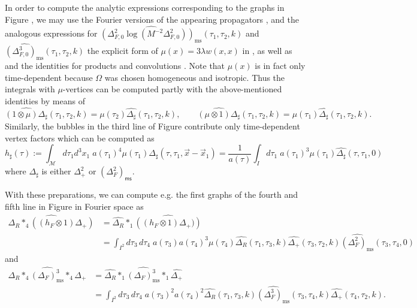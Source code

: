 \documentclass[10pt]{book}
\newcommand{\ms}{\mathsf{ms}}
\let\int\int
\newcommand{\Mcal}{\mathcal{M}}
\theoremstyle{break}
\begin{document}
In order to compute the analytic expressions corresponding to the graphs in Figure %
, we may use the Fourier versions of the appearing propagators %
, and the analogous expressions for $\widehat{\left(\Delta^2_{F,0}\log\left(M^{-2}\Delta^2_{F,0}\right) \right)_\text{ms}}(\tau_1,\tau_2,k)$ and 
$\widehat{\left(\Delta^3_{F,0}\right)_\text{ms}}(\tau_1,\tau_2,k)$ the explicit form of $\mu(x)=3\lambda w(x,x)$ in %
, as well as %
and the identities for products and convolutions %
. Note that $\mu(x)$ is in fact only time-dependent because $\Omega$ was chosen homogeneous and isotropic. Thus the integrals with $\mu$-vertices can be computed partly with the above-mentioned identities by means of 
$$\widehat{(1\otimes \mu) \Delta_{\sharp}}(\tau_1,\tau_2,k)=\mu(\tau_2)\widehat{\Delta_{\sharp}}(\tau_1,\tau_2,k),\qquad\widehat{(\mu\otimes 1) \Delta_{\sharp}}(\tau_1,\tau_2,k)=\mu(\tau_1)\widehat{\Delta_{\sharp}}(\tau_1,\tau_2,k).$$
Similarly, the bubbles in the third line of Figure %
contribute only time-dependent vertex factors which can be computed as 
$$h_\sharp(\tau):=\int_\Mcal d\tau_1 d^3x_1\; a(\tau_1)^4\mu(\tau_1)\Delta_\sharp(\tau,\tau_1,\vec{x}-\vec{x}_1)=\frac{1}{a(\tau)}\int_I d\tau_1\;a(\tau_1)^3 \mu(\tau_1)\widehat{\Delta_\sharp}(\tau,\tau_1,0)$$
where $\Delta_\sharp$ is either $\Delta^2_+$ or $\left(\Delta^2_F\right)_\ms$.

With these preparations, we can compute e.g. the first graphs of the fourth and fifth line in Figure %
in Fourier space as
\begin{align*}
\widehat{\Delta_R\ast_4((h_F\otimes 1)\Delta_+)}&=\widehat{\Delta_R}\ast_1\widehat{\left((h_F\otimes 1)\Delta_+)\right)}\\
&=\int_{I^2} d\tau_3\,d\tau_4\; a(\tau_3)a(\tau_4)^3\mu(\tau_4)\widehat{\Delta_R}(\tau_1,\tau_3,k)\widehat{\Delta_+}(\tau_3,\tau_2,k)\widehat{(\Delta^2_F)_\text{ms}}(\tau_3,\tau_4,0)
\end{align*}
and
\begin{align*}
\widehat{\Delta_R\ast_4(\Delta_F)^3_\text{ms}\ast_4\Delta_+}&=\widehat{\Delta_R}\ast_1\widehat{(\Delta_F)^3_\text{ms}}\ast_1\widehat{\Delta_+}\\
&=\int_{I^2} d\tau_3\,d\tau_4\; a(\tau_3)^2a(\tau_4)^2\widehat{\Delta_R}(\tau_1,\tau_3,k)\widehat{(\Delta^3_F)_\text{ms}}(\tau_3,\tau_4,k)\widehat{\Delta_+}(\tau_4,\tau_2,k).
\end{align*}
\end{document}
